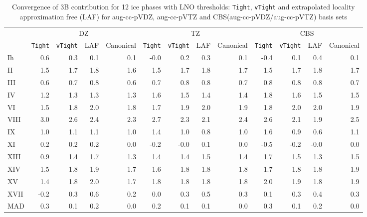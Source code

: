 \begin{table}[h]

\caption{\label{tab:3b_lno_conv}Convergence of 3B contribution for 12 ice phases with LNO thresholds: {\tt Tight}, {\tt vTight} and extrapolated locality approximation free (LAF) for aug-cc-pVDZ, aug-cc-pVTZ and CBS(aug-cc-pVDZ/aug-cc-pVTZ) basis sets}
\begin{tabular}{lrrrrrrrrrrrr}
\toprule
 & \multicolumn{4}{c}{DZ} & \multicolumn{4}{c}{TZ} & \multicolumn{4}{c}{CBS} \\ \cmidrule(lr){2-5} \cmidrule(lr){6-9} \cmidrule(lr){10-13} 
 & {\tt Tight} & {\tt vTight} & LAF & Canonical & {\tt Tight} & {\tt vTight} & LAF & Canonical & {\tt Tight} & {\tt vTight} & LAF & Canonical \\
\midrule
Ih & 0.6 & 0.3 & 0.1 & 0.1 & -0.0 & 0.2 & 0.3 & 0.1 & -0.4 & 0.1 & 0.4 & 0.1 \\
II & 1.5 & 1.7 & 1.8 & 1.6 & 1.5 & 1.7 & 1.8 & 1.7 & 1.5 & 1.7 & 1.8 & 1.7 \\
III & 0.6 & 0.7 & 0.8 & 0.6 & 0.7 & 0.8 & 0.8 & 0.7 & 0.8 & 0.8 & 0.8 & 0.7 \\
IV & 1.2 & 1.3 & 1.3 & 1.3 & 1.6 & 1.5 & 1.4 & 1.4 & 1.8 & 1.6 & 1.5 & 1.5 \\
VI & 1.5 & 1.8 & 2.0 & 1.8 & 1.7 & 1.9 & 2.0 & 1.9 & 1.8 & 2.0 & 2.0 & 1.9 \\
VIII & 3.0 & 2.6 & 2.4 & 2.3 & 2.7 & 2.3 & 2.1 & 2.4 & 2.6 & 2.1 & 1.9 & 2.5 \\
IX & 1.0 & 1.1 & 1.1 & 1.0 & 1.4 & 1.0 & 0.8 & 1.0 & 1.6 & 0.9 & 0.6 & 1.1 \\
XI & 0.2 & 0.2 & 0.2 & 0.0 & -0.2 & -0.0 & 0.1 & 0.0 & -0.5 & -0.2 & -0.0 & 0.0 \\
XIII & 0.9 & 1.4 & 1.7 & 1.3 & 1.4 & 1.4 & 1.5 & 1.4 & 1.7 & 1.5 & 1.3 & 1.5 \\
XIV & 1.5 & 1.8 & 1.9 & 1.7 & 1.6 & 1.8 & 1.8 & 1.8 & 1.7 & 1.8 & 1.8 & 1.9 \\
XV & 1.4 & 1.8 & 2.0 & 1.7 & 1.8 & 1.8 & 1.8 & 1.8 & 2.0 & 1.9 & 1.8 & 1.9 \\
XVII & -0.2 & 0.3 & 0.6 & 0.2 & 0.0 & 0.3 & 0.5 & 0.3 & 0.1 & 0.3 & 0.4 & 0.3 \\
\midrule MAD & 0.3 & 0.1 & 0.2 & 0.0 & 0.2 & 0.1 & 0.1 & 0.0 & 0.3 & 0.1 & 0.2 & 0.0 \\
\bottomrule
\end{tabular}

\end{table}